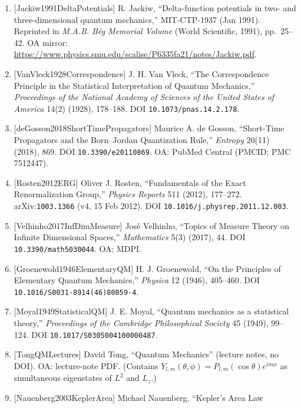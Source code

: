 \documentclass[
]{article}
\begin{document}
\begin{enumerate}
  ``Perturbative Renormalization in Quantum Mechanics,'' \emph{Physics
  Letters B} 328 (1994), 113--118. arXiv:\texttt{hep-th/9309013} (v1, 2
  Sep 1993). DOI \texttt{10.1016/0370-2693(94)90437-5}.
\item
  {[}Jackiw1991DeltaPotentials{]} R. Jackiw, ``Delta-function potentials
  in two- and three-dimensional quantum mechanics,'' MIT-CTP-1937 (Jan
  1991). Reprinted in \emph{M.A.B. Bég Memorial Volume} (World
  Scientific, 1991), pp.~25--42. OA mirror:
  \url{https://www.physics.smu.edu/scalise/P6335fa21/notes/Jackiw.pdf}.
\item
  {[}VanVleck1928Correspondence{]} J. H. Van Vleck, ``The Correspondence
  Principle in the Statistical Interpretation of Quantum Mechanics,''
  \emph{Proceedings of the National Academy of Sciences of the United
  States of America} 14(2) (1928), 178--188. DOI
  \texttt{10.1073/pnas.14.2.178}.
\item
  {[}deGosson2018ShortTimePropagators{]} Maurice A. de Gosson,
  ``Short-Time Propagators and the Born--Jordan Quantization Rule,''
  \emph{Entropy} 20(11) (2018), 869. DOI \texttt{10.3390/e20110869}. OA:
  PubMed Central (PMCID: PMC 7512447).
\item
  {[}Rosten2012ERG{]} Oliver J. Rosten, ``Fundamentals of the Exact
  Renormalization Group,'' \emph{Physics Reports} 511 (2012), 177--272.
  arXiv:\texttt{1003.1366} (v4, 15 Feb 2012). DOI
  \texttt{10.1016/j.physrep.2011.12.003}.
\item
  {[}Velhinho2017InfDimMeasure{]} José Velhinho, ``Topics of Measure
  Theory on Infinite Dimensional Spaces,'' \emph{Mathematics} 5(3)
  (2017), 44. DOI \texttt{10.3390/math5030044}. OA: MDPI.
\item
  {[}Groenewold1946ElementaryQM{]} H. J. Groenewold, ``On the Principles
  of Elementary Quantum Mechanics,'' \emph{Physica} 12 (1946), 405--460.
  DOI \texttt{10.1016/S0031-8914(46)80059-4}.
\item
  {[}Moyal1949StatisticalQM{]} J. E. Moyal, ``Quantum mechanics as a
  statistical theory,'' \emph{Proceedings of the Cambridge Philosophical
  Society} 45 (1949), 99--124. DOI \texttt{10.1017/S0305004100000487}.
\item
  {[}TongQMLectures{]} David Tong, ``Quantum Mechanics'' (lecture notes,
  no DOI). OA: lecture-note PDF. (Contains
  \(Y_{l,m}(\theta,\phi)=P_{l,m}(\cos\theta)e^{im\phi}\) as simultaneous
  eigenstates of \(L^2\) and \(L_z\).)
\item
  {[}Nauenberg2003KeplerArea{]} Michael Nauenberg, ``Kepler's Area Law

\end{enumerate}
\end{document}
